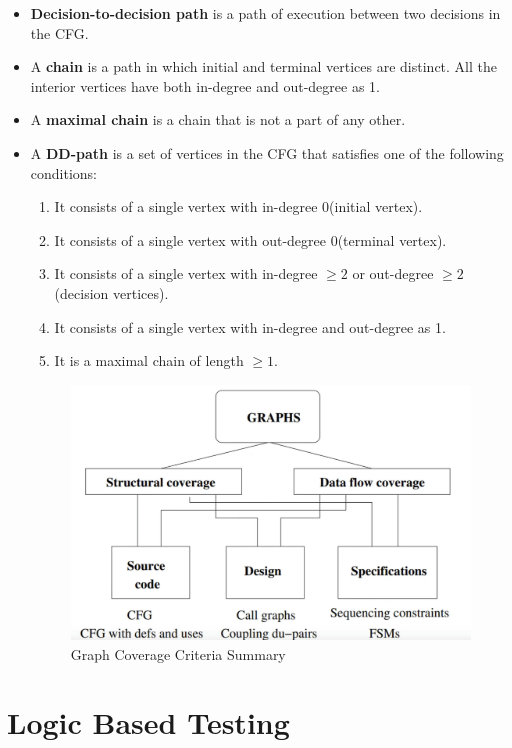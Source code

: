 \documentclass[a4paper]{article}
\begin{document}
\begin{itemize}
    \item \textbf{Decision-to-decision path} is a path of execution between two decisions in the CFG.
    \item A \textbf{chain} is a path in which initial and terminal vertices are distinct. All the interior vertices have both in-degree and out-degree as 1.
    \item A \textbf{maximal chain} is a chain that is not a part of any other.
    \item A \textbf{DD-path} is a set of vertices in the CFG that satisfies one of the following conditions:
    \begin{enumerate}
        \item It consists of a single vertex with in-degree 0(initial vertex).
        \item It consists of a single vertex with out-degree 0(terminal vertex).
        \item It consists of a single vertex with in-degree $\geq 2$ or out-degree $\geq 2$(decision vertices).
        \item It consists of a single vertex with in-degree and out-degree as 1.
        \item It is a maximal chain of length $\geq 1$.
    \end{enumerate}
    \begin{figure}[H]
        \centering
        \includegraphics[width=0.5\linewidth]{Degree//static/ST_Graph_summary.png}
        \caption{Graph Coverage Criteria Summary}
        \label{fig:ST-graph-coverage-summary}
    \end{figure}
\end{itemize}

\section{Logic Based Testing}
\end{document}
